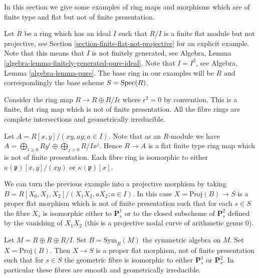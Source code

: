 \noindent
In this section we give some examples of ring maps and morphisms
which are of finite type and flat but not of finite presentation.

\medskip\noindent
Let $R$ be a ring which has an ideal $I$ such that $R/I$ is a finite
flat module but not projective, see
Section \ref{section-finite-flat-not-projective}
for an explicit example. Note that this means that $I$ is not
finitely generated, see
Algebra, Lemma \ref{algebra-lemma-finitely-generated-pure-ideal}.
Note that $I = I^2$, see
Algebra, Lemma \ref{algebra-lemma-pure}.
The base ring in our examples will be
$R$ and correspondingly the base scheme $S = \mathop{\mathrm{Spec}}(R)$.

\medskip\noindent
Consider the ring map $R \to R \oplus R/I\epsilon$ where
$\epsilon^2 = 0$ by convention. This is a finite, flat
ring map which is not of finite presentation. All the fibre rings
are complete intersections and geometrically irreducible.

\medskip\noindent
Let $A = R[x, y]/(xy, ay; a \in I)$. Note that as an $R$-module
we have $A = \bigoplus_{i \geq 0} Ry^i \oplus \bigoplus_{j > 0} R/Ix^j$.
Hence $R \to A$ is a flat finite type ring map which is not of finite
presentation. Each fibre ring
is isomorphic to either $\kappa(\mathfrak p)[x, y]/(xy)$
or $\kappa(\mathfrak p)[x]$.

\medskip\noindent
We can turn the previous example into a projective morphism by
taking $B = R[X_0, X_1, X_2]/(X_1X_2, aX_2; a \in I)$.
In this case $X = \text{Proj}(B) \to S$ is a proper flat morphism
which is not of finite presentation such that for each $s \in S$
the fibre $X_s$ is isomorphic either to $\mathbf{P}^1_s$ or to
the closed subscheme of $\mathbf{P}^2_s$ defined by the vanishing of
$X_1X_2$ (this is a projective nodal curve of arithmetic genus $0$).

\medskip\noindent
Let $M = R \oplus R \oplus R/I$. Set $B = \text{Sym}_R(M)$ the
symmetric algebra on $M$. Set $X = \text{Proj}(B)$.
Then $X \to S$ is a proper flat morphism, not of finite presentation
such that for $s \in S$ the geometric fibre is isomorphic to either
$\mathbf{P}^1_s$ or $\mathbf{P}^2_s$. In particular these fibres are
smooth and geometrically irreducible.

